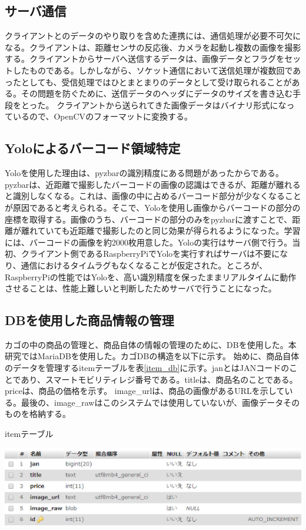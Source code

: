 \newpage

\subsection*{サーバ通信}
クライアントとのデータのやり取りを含めた連携には、通信処理が必要不可欠になる。クライアントは、距離センサの反応後、カメラを起動し複数の画像を撮影する。クライアントからサーバへ送信するデータは、画像データとフラグをセットしたものである。しかしながら、ソケット通信において送信処理が複数回であったとしても、受信処理ではひとまとまりのデータとして受け取られることがある。その問題を防ぐために、送信データのヘッダにデータのサイズを書き込む手段をとった。
クライアントから送られてきた画像データはバイナリ形式になっているので、OpenCV\cite{opencv}のフォーマットに変換する。

\subsection*{Yoloによるバーコード領域特定}
Yoloを使用した理由は、pyzbar\cite{pyzbar}の識別精度にある問題があったからである。pyzbar\cite{pyzbar}は、近距離で撮影したバーコードの画像の認識はできるが、距離が離れると識別しなくなる。これは、画像の中に占めるバーコード部分が少なくなることが原因であると考えられる。そこで、Yoloを使用し画像からバーコードの部分の座標を取得する。画像のうち、バーコードの部分のみをpyzbarに渡すことで、距離が離れていても近距離で撮影したのと同じ効果が得られるようになった。学習には、バーコードの画像を約2000枚用意した。Yoloの実行はサーバ側で行う。当初、クライアント側であるRaspberryPiでYoloを実行すればサーバは不要になり、通信におけるタイムラグもなくなることが仮定された。ところが、RaspberryPiの性能ではYoloを、高い識別精度を保ったままリアルタイムに動作させることは、性能上難しいと判断したためサーバで行うことになった。

\newpage

\subsection*{DBを使用した商品情報の管理}
カゴの中の商品の管理と、商品自体の情報の管理のために、DBを使用した。本研究ではMariaDBを使用した。カゴDBの構造を以下に示す。
始めに、商品自体のデータを管理するitemテーブルを表\ref{item_db}に示す。janとはJANコードのことであり、スマートモビリティレジ番号である。titleは、商品名のことである。priceは、商品の価格を示す。
image\_urlは、商品の画像があるURLを示している。最後の、image\_rawはこのシステムでは使用していないが、画像データそのものを格納する。
\begin{table}[htbp]
\centering
\caption{itemテーブル}
\includegraphics[width=15cm]{./pic/item_db.eps}
\label{item_db}
\end{table}

